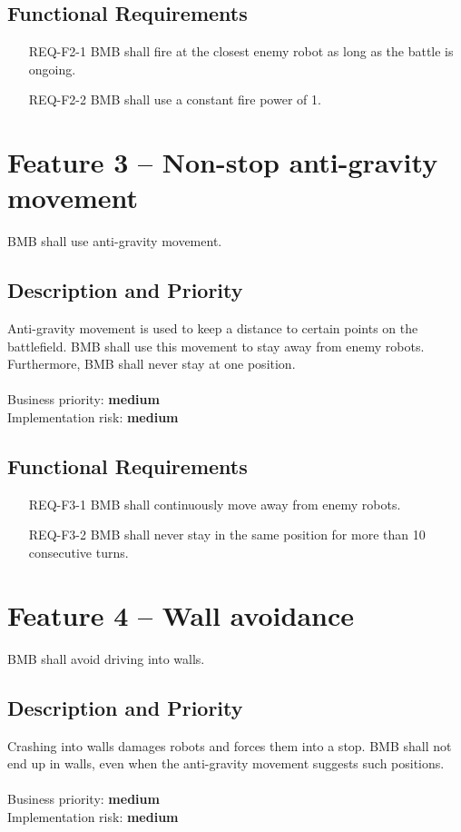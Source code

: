 \documentclass{scrreprt}
\begin{document}
\subsection{Functional Requirements}
\begin{itemize}
\item[REQ-F2-1] BMB shall fire at the closest enemy robot as long as the battle is ongoing.
\item[REQ-F2-2] BMB shall use a constant fire power of 1.
\end{itemize}

\section{Feature 3 -- Non-stop anti-gravity movement}
BMB shall use anti-gravity movement.
	
\subsection{Description and Priority}
Anti-gravity movement is used to keep a distance to certain points on the battlefield. BMB shall use this movement to stay away from enemy robots. Furthermore, BMB shall never stay at one position.\\\\Business priority: \textbf{medium}\\
Implementation risk: \textbf{medium}

\subsection{Functional Requirements}
\begin{itemize}
\item[REQ-F3-1] BMB shall continuously move away from enemy robots.
\item[REQ-F3-2] BMB shall never stay in the same position for more than 10 consecutive turns.
\end{itemize}

\section{Feature 4 -- Wall avoidance}
BMB shall avoid driving into walls.

\subsection{Description and Priority}
Crashing into walls damages robots and forces them into a stop. BMB shall not end up in walls, even when the anti-gravity movement suggests such positions.\\\\Business priority: \textbf{medium}\\
Implementation risk: \textbf{medium}
\end{document}
